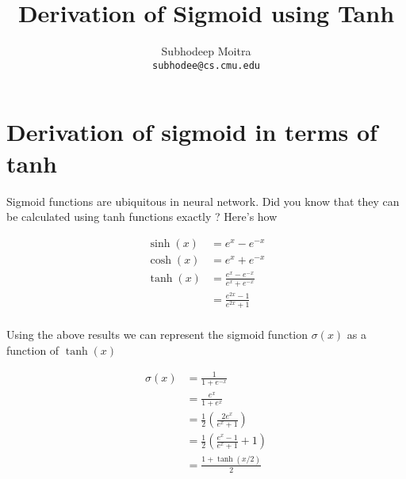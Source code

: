 \documentclass{article}[12pt]
\begin{document}
\title{Derivation of Sigmoid using Tanh}
\author{Subhodeep Moitra \\ \tt{subhodee@cs.cmu.edu}}

\maketitle

\section{Derivation of sigmoid in terms of tanh}
Sigmoid functions are ubiquitous in neural network. Did you know that they can be calculated using tanh functions exactly ? Here's how


\begin{align*}
\sinh(x) &= e^x - e^{-x} \\
\cosh(x) &= e^x + e^{-x} \\
\tanh(x) &= \frac{e^x - e^{-x}}{e^x + e^{-x}}  \\
	&= \frac{e^{2x} - 1}{e^{2x} + 1}  \\
\end{align*}


Using the above results we can represent the sigmoid function $\sigma(x)$ as a function of $\tanh(x)$

\begin{align*}
\sigma(x) &= \frac{1}{1 + e^{-x}} \\
		&= \frac{e^x}{1 + e^{x}} \\
		&= \frac{1}{2}\left(\frac{2e^x}{e^x + 1}\right) \\
		&= \frac{1}{2}\left(\frac{e^{x} - 1}{e^{x} + 1} + 1\right) \\
		&= \frac{1 + \tanh(x/2)}{2} 
\end{align*}
\end{document}

